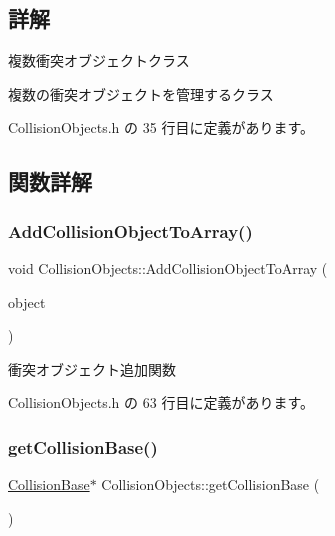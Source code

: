 \subsection{詳解}
複数衝突オブジェクトクラス 

複数の衝突オブジェクトを管理するクラス 

 Collision\+Objects.\+h の 35 行目に定義があります。



\subsection{関数詳解}
\mbox{\label{class_collision_objects_a50d6593f98cd04e23ad7ea9102eccc3c}} 
\subsubsection{\texorpdfstring{Add\+Collision\+Object\+To\+Array()}{AddCollisionObjectToArray()}}
{\footnotesize\ttfamily void Collision\+Objects\+::\+Add\+Collision\+Object\+To\+Array (\begin{DoxyParamCaption}\item[{\mbox{\hyperlink{class_collision_object}{Collision\+Object}} $\ast$}]{object }\end{DoxyParamCaption})\hspace{0.3cm}{\ttfamily [inline]}}



衝突オブジェクト追加関数 



 Collision\+Objects.\+h の 63 行目に定義があります。

\mbox{\label{class_collision_objects_af95769194fff92babcf411c2262c9d10}} 
\subsubsection{\texorpdfstring{get\+Collision\+Base()}{getCollisionBase()}}
{\footnotesize\ttfamily \mbox{\hyperlink{class_collision_base}{Collision\+Base}}$\ast$ Collision\+Objects\+::get\+Collision\+Base (\begin{DoxyParamCaption}{ }\end{DoxyParamCaption})\hspace{0.3cm}{\ttfamily [inline]}}



